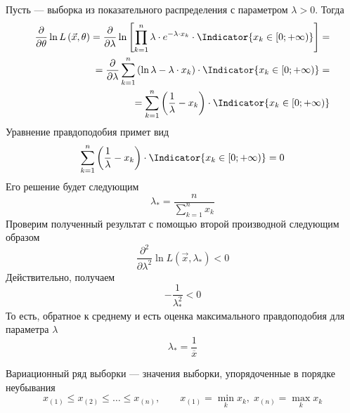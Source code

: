 \begin{example}
  Пусть \xsample --- выборка из показательного распределения с
  параметром $\lambda > 0$.
  Тогда
  \begin{align*}
    \frac{\partial}{\partial\theta} \ln{L\left( \vec{x}, \theta \right)} =
    \frac{\partial}{\partial \lambda} \ln{\left[ \prod_{k=1}^n \lambda
      \cdot e^{- \lambda \cdot x_k}
      \cdot \Indicator{x_k \in \left[ 0; + \infty \right)} \right]} = \\
    = \frac{\partial}{\partial \lambda} \sum_{k=1}^{n} \left( \ln{\lambda}
        - \lambda \cdot x_k \right)
      \cdot \Indicator{x_k \in \left[ 0; + \infty \right)} = \\
    = \sum_{k=1}^{n} \left( \frac{1}{\lambda} - x_k \right)
      \cdot \Indicator{x_k \in \left[ 0; + \infty \right)}
  \end{align*}
  Уравнение правдоподобия примет вид
  \begin{equation*}
    \sum_{k=1}^{n} \left( \frac{1}{\lambda} - x_k \right)
      \cdot \Indicator{x_k \in \left[ 0; + \infty \right)} = 0
  \end{equation*}
  Его решение будет следующим
  \begin{equation*}
    \lambda_* = \frac{n}{\sum_{k=1}^{n} x_k}
  \end{equation*}
  Проверим полученный результат с помощью второй производной следующим образом
  \begin{equation*}
    \frac{\partial^2}{\partial \lambda^2}
    \ln{L\left( \vec{x}, \lambda_* \right)} < 0
  \end{equation*}
  Действительно, получаем
  \begin{equation*}
    -\frac{1}{\lambda_*^2} < 0
  \end{equation*}
  То есть, обратное к среднему и есть оценка максимального правдоподобия для
  параметра $\lambda$
  \begin{equation*}
    \lambda_* = \frac{1}{\overline{x}}
  \end{equation*}
\end{example}

\begin{definition}
  Вариационный ряд выборки \xsample --- значения выборки,
  упорядоченные в порядке неубывания
  \begin{equation*}
    x_{\left(1\right)} \le x_{\left(2\right)} \le \dots
      \le x_{\left(n\right)},\qquad
    x_{\left(1\right)}= \underset{k}\min{x_k},\;
    x_{\left(n\right)}= \underset{k}\max{x_k}
  \end{equation*}
\end{definition}

